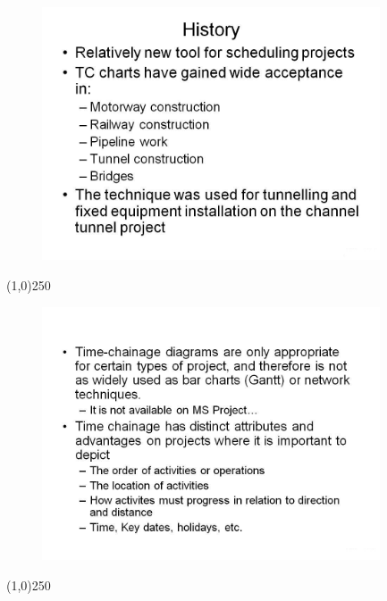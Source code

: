 \begin{frame}
\begin{figure}
	\centering
		\includegraphics[width = 10.0cm]{oldnotes/Slide301.jpg}
\end{figure}
\end{frame}
\begin{center}\line(1,0){250}\end{center}




\begin{frame}
\begin{figure}
	\centering
		\includegraphics[width = 10.0cm]{oldnotes/Slide302.jpg}
\end{figure}
\end{frame}
\begin{center}\line(1,0){250}\end{center}




